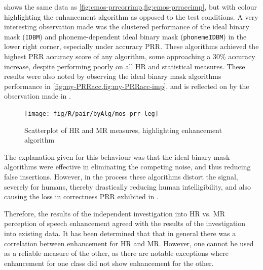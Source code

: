  shows the same data as \cref{fig:cmos-prrcorrimp,fig:cmos-prraccimp},
but with colour highlighting the enhancement algorithm as opposed
to the test conditions. A very interesting observation made was the
clustered performance of the ideal binary mask (\lstinline!IDBM!)
and phoneme-dependent ideal binary mask (\lstinline!phonemeIDBM!)
in the lower right corner, especially under accuracy \ac{PRR}. These
algorithms achieved the highest \ac{PRR} accuracy score of any algorithm,
some approaching a 30\% accuracy increase, despite performing poorly
on all \ac{HR} and statistical measures. These results were also
noted by observing the ideal binary mask algorithms performance in
\cref{fig:my-PRRacc,fig:my-PRRacc-imp}, and is reflected on by the
observation made in .

\begin{figure}[h]

\noindent \begin{centering}
\texttt{[image: fig/R/pair/byAlg/mos-prr-leg]}
\par\end{centering}

\protect\caption{\label{fig:hr-mr-alg}Scatterplot of \acs{HR} and \acs{MR} measures,
highlighting enhancement algorithm}
\end{figure}


The explanation given for this behaviour was that the ideal binary
mask algorithms were effective in eliminating the competing noise,
and thus reducing false insertions. However, in the process these
algorithms distort the signal, severely for humans, thereby drastically
reducing human intelligibility, and also causing the loss in correctness
\ac{PRR} exhibited in .

Therefore, the results of the independent investigation into \ac{HR}
vs. \ac{MR} perception of speech enhancement agreed with the results
of the investigation into existing data. It has been determined that
that in general there was a correlation between enhancement for \ac{HR}
and \ac{MR}. However, one cannot be used as a reliable measure of
the other, as there are notable exceptions where enhancement for one
class did not show enhancement for the other.


